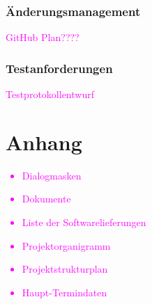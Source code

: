 \subsubsection{Änderungsmanagement}
\textcolor{magenta}{GitHub Plan????}

\subsubsection{Testanforderungen}
\textcolor{magenta}{Testprotokollentwurf}



\section{Anhang}

\textcolor{magenta}{
\begin{itemize}
	\item Dialogmasken
	\item Dokumente
	\item Liste der Softwarelieferungen
	\item Projektorganigramm
	\item Projektstrukturplan
	\item Haupt-Termindaten
\end{itemize}
}